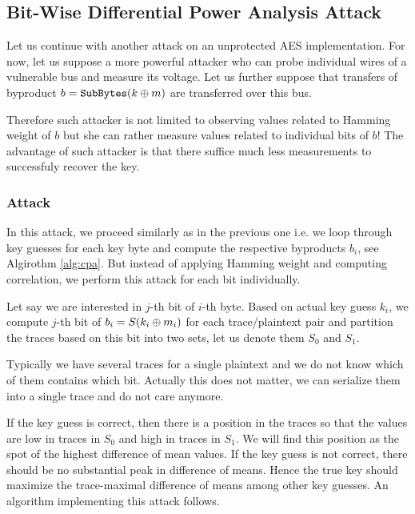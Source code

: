 \subsection{Bit-Wise Differential Power Analysis Attack}

Let us continue with another attack on an unprotected AES implementation. For now, let us suppose a more powerful attacker who can probe individual wires of a vulnerable bus and measure its voltage. Let us further suppose that transfers of byproduct $b = \texttt{SubBytes}(k\oplus m)$ are transferred over this bus.

Therefore such attacker is not limited to observing values related to Hamming weight of $b$ but she can rather measure values related to individual bits of $b$! The advantage of such attacker is that there suffice much less measurements to successfuly recover the key.

\subsubsection{Attack}
	
	In this attack, we proceed similarly as in the previous one i.e. we loop through key guesses for each key byte and compute the respective byproducts $b_i$, see Algirothm \ref{alg:cpa}. But instead of applying Hamming weight and computing correlation, we perform this attack for each bit individually.
	
	Let say we are interested in $j$-th bit of $i$-th byte. Based on actual key guess $k_i$, we compute $j$-th bit of $b_i = S(k_i\oplus m_i)$ for each trace/plaintext pair and partition the traces based on this bit into two sets, let us denote them $S_0$ and $S_1$.
	
	\begin{note}
	\label{note:concattraces}
		Typically we have several traces for a single plaintext and we do not know which of them contains which bit. Actually this does not matter, we can serialize them into a single trace and do not care anymore.
	\end{note}
	
	If the key guess is correct, then there is a position in the traces so that the values are low in traces in $S_0$ and high in traces in $S_1$. We will find this position as the spot of the highest difference of mean values. If the key guess is not correct, there should be no substantial peak in difference of means. Hence the true key should maximize the trace-maximal difference of means among other key guesses. An algorithm implementing this attack follows.
	
